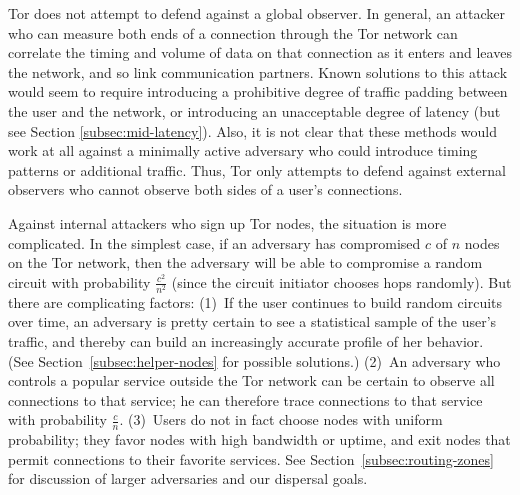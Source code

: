 \documentclass{llncs}
\begin{document}
Tor does not attempt to defend against a global observer.  In general, an
attacker who can measure both ends of a connection through the Tor network
can correlate the timing and volume of data on that connection as it enters
and leaves the network, and so link communication partners.
Known solutions to this attack would seem to require introducing a
prohibitive degree of traffic padding between the user and the network, or
introducing an unacceptable degree of latency (but see Section
\ref{subsec:mid-latency}).  Also, it is not clear that these methods would
work at all against a minimally active adversary who could introduce timing
patterns or additional traffic.  Thus, Tor only attempts to defend against
external observers who cannot observe both sides of a user's connections.


Against internal attackers who sign up Tor nodes, the situation is more
complicated.  In the simplest case, if an adversary has compromised $c$ of
$n$ nodes on the Tor network, then the adversary will be able to compromise
a random circuit with probability $\frac{c^2}{n^2}$ (since the circuit
initiator chooses hops randomly).  But there are
complicating factors:
(1)~If the user continues to build random circuits over time, an adversary
  is pretty certain to see a statistical sample of the user's traffic, and
  thereby can build an increasingly accurate profile of her behavior.  (See
  Section~\ref{subsec:helper-nodes} for possible solutions.)
(2)~An adversary who controls a popular service outside the Tor network
  can be certain to observe all connections to that service; he
  can therefore trace connections to that service with probability
  $\frac{c}{n}$.
(3)~Users do not in fact choose nodes with uniform probability; they
  favor nodes with high bandwidth or uptime, and exit nodes that
  permit connections to their favorite services.
See Section~\ref{subsec:routing-zones} for discussion of larger
adversaries and our dispersal goals.
\end{document}
